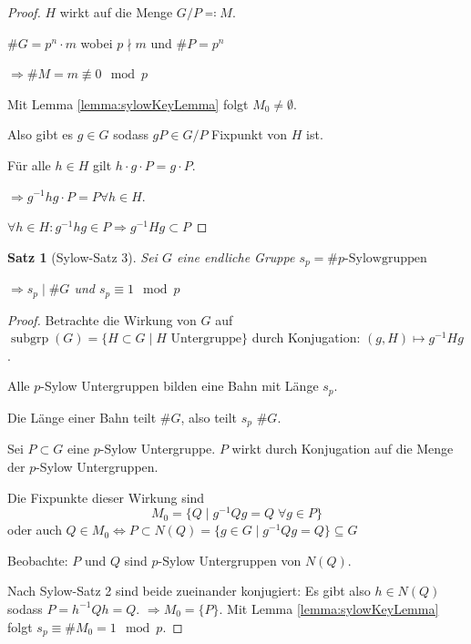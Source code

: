 \documentclass[a4paper,12pt,numbers=noenddot,parskip=full]{scrartcl}
\theoremstyle{dotless}
\newtheorem{theorem}{Satz}[section]
\theoremstyle{remark}
\begin{document}
	\begin{proof}
		$H$ wirkt auf die Menge $G/P \eqqcolon M$.
		
		$\#G = p^n \cdot m$ wobei $p \nmid m$ und $\#P = p^n$
		
		$\Rightarrow \#M = m \not\equiv 0 \mod p$
		
		Mit Lemma \ref{lemma:sylowKeyLemma} folgt $M_0 \neq \emptyset$.
		
		Also gibt es $g \in G$ sodass $gP \in G/P$ Fixpunkt von $H$ ist.
		
		Für alle $h \in H$ gilt $h \cdot g \cdot P = g \cdot P$.
		
		$\Rightarrow g^{-1} h g \cdot P = P \forall h \in H$.
		
		$\forall h \in H: g^{-1} h g \in P \Rightarrow g^{-1} H g \subset P$
	\end{proof}

	\begin{theorem}[Sylow-Satz 3]
		Sei $G$ eine endliche Gruppe $s_p = \#\text{$p$-Sylowgruppen}$
		
		$\Rightarrow s_p \mid \#G$ und $s_p \equiv 1 \mod p$
	\end{theorem}

	\begin{proof}
		Betrachte die Wirkung von $G$ auf $\operatorname{subgrp}(G) = \{ H \subset G \mid \text{$H$ Untergruppe} \}$ durch Konjugation: $(g, H) \mapsto g^{-1} H g$.
		
		Alle $p$-Sylow Untergruppen bilden eine Bahn mit Länge $s_p$.
		
		Die Länge einer Bahn teilt $\#G$, also teilt $s_p$ $\#G$.
		
		Sei $P \subset G$ eine $p$-Sylow Untergruppe. $P$ wirkt durch Konjugation auf die Menge der $p$-Sylow Untergruppen.
		
		Die Fixpunkte dieser Wirkung sind
		\begin{equation*}
			M_0 = \{ Q \mid g^{-1} Q g = Q \; \forall g \in P \}
		\end{equation*}
		oder auch $Q \in M_0 \Leftrightarrow P \subset N(Q) = \{ g \in G \mid g^{-1} Q g = Q \} \subseteq G$
		
		Beobachte: $P$ und $Q$ sind $p$-Sylow Untergruppen von $N(Q)$.
		
		Nach Sylow-Satz 2 sind beide zueinander konjugiert: Es gibt also $h \in N(Q)$ sodass $P = h^{-1} Q h = Q$. $\Rightarrow M_0 = \{ P \}$. Mit Lemma \ref{lemma:sylowKeyLemma} folgt $s_p \equiv \# M_0 = 1 \mod p$.
	\end{proof}
\end{document}
